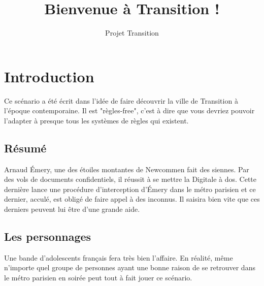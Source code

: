 \documentclass[10pt,a4paper,twocolumn]{article}
\author{Projet Transition}
\title{Bienvenue à Transition !}
\begin{document}
\maketitle
\section{Introduction}
Ce scénario a été écrit dans l'idée de faire découvrir la ville de Transition à l'époque contemporaine. Il est "règles-free", c'est à dire que vous devriez pouvoir l'adapter à presque tous les systèmes de règles qui existent.
\subsection{Résumé}
Arnaud Émery, une des étoiles montantes de Newcommen fait des siennes. Par des vols de documents confidentiels, il réussit à se mettre la Digitale à dos. Cette dernière lance une procédure d'interception d'Émery dans le métro parisien et ce dernier, acculé, est obligé de faire appel à des inconnus. Il saisira bien vite que ces derniers peuvent lui être d'une grande aide.
\subsection{Les personnages}
Une bande d'adolescents français fera très bien l'affaire. En réalité, même n'importe quel groupe de personnes ayant une bonne raison de se retrouver dans le métro parisien en soirée peut tout à fait jouer ce scénario.
\end{document}
